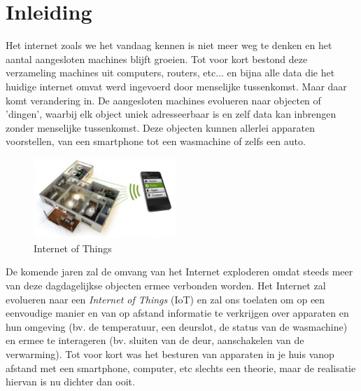 \chapter{Inleiding}

Het internet zoals we het vandaag kennen is niet meer weg te denken en het aantal aangesloten machines blijft groeien. Tot voor kort bestond deze verzameling machines uit computers, routers, etc... en bijna alle data die het huidige internet omvat werd ingevoerd door menselijke tussenkomst.
Maar daar komt verandering in. De aangesloten machines evolueren naar objecten of 'dingen', waarbij elk object uniek adresseerbaar is en zelf data kan inbrengen zonder menselijke tussenkomst. Deze objecten kunnen allerlei apparaten voorstellen, van een smartphone tot een wasmachine of zelfs een auto.\\

\begin{figure}
\vspace{-10pt}
\includegraphics[width=0.48\textwidth]{fig/InternetOfThings}
\vspace{-10pt}
\caption{Internet of Things}
\vspace{-10pt}
\end{figure}
De komende jaren zal de omvang van het Internet exploderen omdat steeds meer van deze dagdagelijkse objecten ermee verbonden worden. Het Internet zal evolueren naar een \textit{Internet of Things} (IoT) en zal ons toelaten om op een eenvoudige manier en van op afstand informatie te verkrijgen over apparaten en hun omgeving (bv. de temperatuur, een deurslot, de status van de wasmachine) en ermee te interageren (bv. sluiten van de deur, aanschakelen van de verwarming). Tot voor kort was het besturen van apparaten in je huis vanop afstand met een smartphone, computer, etc slechts een theorie, maar de realisatie hiervan is nu dichter dan ooit.

